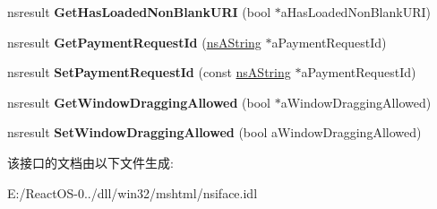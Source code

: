 \begin{DoxyCompactItemize}
nsresult {\bfseries Get\+Has\+Loaded\+Non\+Blank\+U\+RI} (bool $\ast$a\+Has\+Loaded\+Non\+Blank\+U\+RI)
\item 
\mbox{\label{interfacens_i_doc_shell_a22677fc1524e5f46fefaff9884d1193b}} 
nsresult {\bfseries Get\+Payment\+Request\+Id} (\hyperlink{structns_string_container}{ns\+A\+String} $\ast$a\+Payment\+Request\+Id)
\item 
\mbox{\label{interfacens_i_doc_shell_a1031994890ac2f939d7f84f9e9526f07}} 
nsresult {\bfseries Set\+Payment\+Request\+Id} (const \hyperlink{structns_string_container}{ns\+A\+String} $\ast$a\+Payment\+Request\+Id)
\item 
\mbox{\label{interfacens_i_doc_shell_a1d681a401b9aa855a9a8b4912185ea9a}} 
nsresult {\bfseries Get\+Window\+Dragging\+Allowed} (bool $\ast$a\+Window\+Dragging\+Allowed)
\item 
\mbox{\label{interfacens_i_doc_shell_aab70096ac9064d520353227fd37e0770}} 
nsresult {\bfseries Set\+Window\+Dragging\+Allowed} (bool a\+Window\+Dragging\+Allowed)
\end{DoxyCompactItemize}


该接口的文档由以下文件生成\+:\begin{DoxyCompactItemize}
\item 
E\+:/\+React\+O\+S-\/0../dll/win32/mshtml/nsiface.\+idl\end{DoxyCompactItemize}
